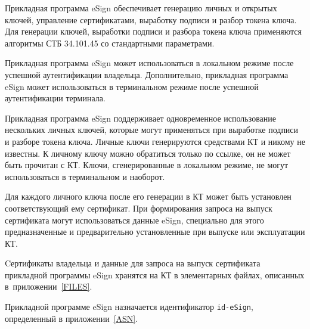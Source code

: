 Прикладная программа eSign обеспечивает генерацию личных и открытых 
ключей, управление сертификатами, выработку подписи и разбор токена ключа.
Для генерации ключей, выработки подписи и разбора токена ключа
применяются алгоритмы СТБ 34.101.45 со стандартными параметрами.

Прикладная программа eSign может использоваться 
в локальном режиме после успешной аутентификации владельца.
Дополнительно, прикладная программа eSign может использоваться 
в терминальном режиме после успешной аутентификации терминала.

Прикладная программа eSign поддерживает одновременное 
использование нескольких личных ключей, 
которые могут применяться при выработке подписи и разборе токена ключа.
Личные ключи генерируются средствами КТ и никому не известны. 
К личному ключу можно обратиться только по ссылке, 
он не может быть прочитан с КТ. 
Ключи, сгенерированные в локальном режиме, не могут использоваться 
в терминальном и наоборот.

Для каждого личного ключа после его генерации в КТ может быть установлен 
соответствующий ему сертификат. 
При формирования запроса на выпуск сертификата могут использоваться
данные eSign, специально для этого предназначенные и предварительно
установленные при выпуске или эксплуатации КТ.

Cертификаты владельца и данные для запроса на выпуск сертификата
прикладной программы eSign хранятся на 
КТ в элементарных файлах, описанных в~приложении~\ref{FILES}.

Прикладной программе eSign назначается идентификатор \verb|id-eSign|, 
определенный в приложении~\ref{ASN}. 

